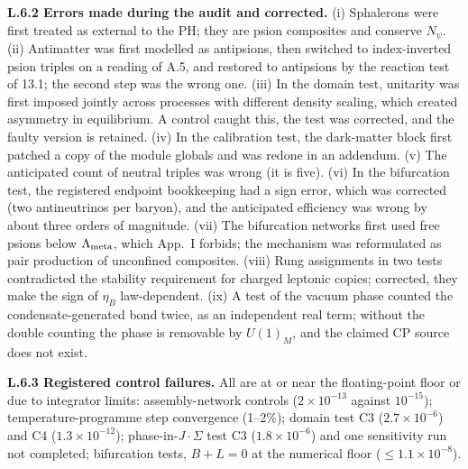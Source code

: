 \noindent \textbf{L.6.2 Errors made during the audit and corrected. }(i) Sphalerons were first treated as external to the PH; they are psion composites and conserve $N_\psi$. (ii) Antimatter was first modelled as antipsions, then switched to index-inverted psion triples on a reading of A.5, and restored to antipsions by the reaction test of 13.1; the second step was the wrong one. (iii) In the domain test, unitarity was first imposed jointly across processes with different density scaling, which created asymmetry in equilibrium. A control caught this, the test was corrected, and the faulty version is retained. (iv) In the calibration test, the dark-matter block first patched a copy of the module globals and was redone in an addendum. (v) The anticipated count of neutral triples was wrong (it is five). (vi) In the bifurcation test, the registered endpoint bookkeeping had a sign error, which was corrected (two antineutrinos per baryon), and the anticipated efficiency was wrong by about three orders of magnitude. (vii) The bifurcation networks first used free psions below $\Lambda_{\rm meta}$, which App.~I forbids; the mechanism was reformulated as pair production of unconfined composites. (viii) Rung assignments in two tests contradicted the stability requirement for charged leptonic copies; corrected, they make the sign of $\eta_B$ law-dependent. (ix) A test of the vacuum phase counted the condensate-generated bond twice, as an independent real term; without the double counting the phase is removable by $U(1)_M$, and the claimed CP source does not exist.

\noindent \textbf{L.6.3 Registered control failures. }All are at or near the floating-point floor or due to integrator limits: assembly-network controls ($2\times10^{-13}$ against $10^{-15}$); temperature-programme step convergence (1--2\%); domain test C3 ($2.7\times10^{-6}$) and C4 ($1.3\times10^{-12}$); phase-in-$J\!\cdot\!\Sigma$ test C3 ($1.8\times10^{-6}$) and one sensitivity run not completed; bifurcation tests, $B+L=0$ at the numerical floor ($\le1.1\times10^{-8}$).
